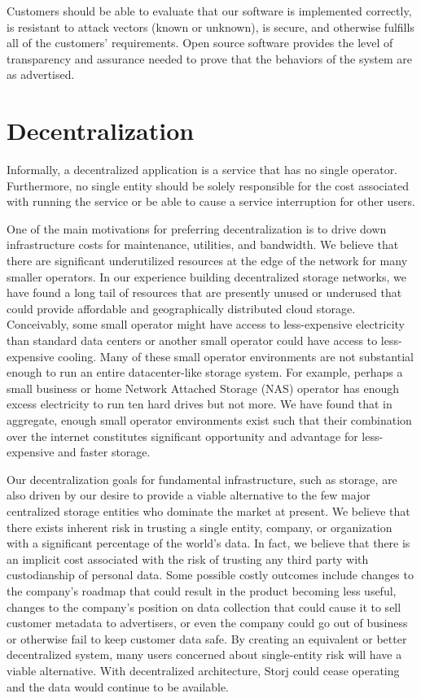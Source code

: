\documentclass[8pt,fleqn,openany]{book}
\begin{document}
Customers should be able to
evaluate that our software is implemented correctly, is resistant to
attack vectors (known or unknown), is secure, and otherwise fulfills all
of the customers' requirements.
Open source software
provides the level of transparency and assurance needed to prove that the
behaviors of the system are as advertised.

\section{Decentralization}

Informally, a decentralized application is a service that has no single
operator. Furthermore, no single entity should be solely responsible for the
cost associated with running the service or be able to cause a service
interruption for other users.

One of the main motivations for preferring decentralization is to drive
down infrastructure costs for maintenance, utilities, and bandwidth.
We believe that there
are significant underutilized resources at the edge of the network
for many smaller operators. In our experience building decentralized
storage networks, we have found a long tail of resources that are presently
unused or underused that could provide affordable and
geographically distributed cloud storage. Conceivably, some small operator
might have access to less-expensive electricity than standard data centers or another small
operator could have access to less-expensive cooling. Many of these small operator
environments are not substantial enough to run an entire datacenter-like
storage system. For example, perhaps a small business or home Network Attached
Storage (NAS) operator has
enough excess electricity to run ten hard drives but not more. We have found that
in aggregate, enough small operator environments exist such that their
combination over the internet constitutes
significant opportunity and advantage for less-expensive and faster storage.

Our decentralization goals for fundamental infrastructure, such as storage, are also driven by our desire to provide a viable alternative to the few major
centralized storage entities who dominate the market at present.
We believe that there exists inherent risk in trusting a single entity,
company, or organization with a significant percentage of the world's data.
In fact, we believe that there is an implicit cost associated with the risk of
trusting any third party with custodianship of personal data.
Some possible costly outcomes include changes to the company's roadmap that could result in the product
becoming less useful, changes to the company's position on data collection that could
cause it to sell customer metadata to advertisers, or even the company could go
out of business or otherwise fail to keep customer data safe.
By creating an equivalent or better decentralized
system, many users concerned about single-entity risk will have a viable
alternative.
With decentralized architecture, Storj could cease operating and the data
would continue to be available.
\end{document}
